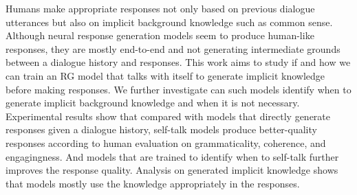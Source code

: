 Humans make appropriate responses not only based on previous dialogue utterances but also on implicit background knowledge such as common sense. Although neural response generation models seem to produce human-like responses, they are mostly end-to-end and not generating intermediate grounds between a dialogue history and responses. This work aims to study if and how we can train an RG model that talks with itself to generate implicit knowledge before making responses. We further investigate can such models identify when to generate implicit background knowledge and when it is not necessary. Experimental results show that compared with models that directly generate responses given a dialogue history, self-talk models produce better-quality responses according to human evaluation on grammaticality, coherence, and engagingness. And models that are trained to identify when to self-talk further improves the response quality. Analysis on generated implicit knowledge shows that models mostly use the knowledge appropriately in the responses.
